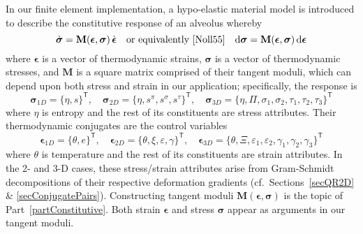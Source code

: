 In our finite element implementation, a hypo-elastic material model \cite{Truesdell55} is introduced to describe the constitutive response of an alveolus whereby
\begin{displaymath}
    \dot{\boldsymbol{\sigma}} = \mathbf{M} ( \boldsymbol{\epsilon} , \boldsymbol{\sigma} ) \, \dot{\boldsymbol{\epsilon}} 
    \quad \text{or equivalently \cite{Noll55}} \quad
    \mathrm{d} \boldsymbol{\sigma} = \mathbf{M} ( \boldsymbol{\epsilon} , \boldsymbol{\sigma} ) \, \mathrm{d} \boldsymbol{\epsilon}
\end{displaymath} 
where $\boldsymbol{\epsilon}$ is a vector of thermo\-dynamic strains, $\boldsymbol{\sigma}$ is a vector of thermo\-dynamic stresses, and $\mathbf{M}$ is a square matrix comprised of their tangent moduli, which can depend upon both stress and strain in our application; specifically, the response is
\begin{displaymath}
   \boldsymbol{\sigma}_{1D} = \{ \eta , s \}^{\mathsf{T}} , \quad
   \boldsymbol{\sigma}_{2D} = \{ \eta , s^{\pi} , s^{\sigma} , s^{\tau} \}^{\mathsf{T}} , \quad
   \boldsymbol{\sigma}_{3D} = \{ \eta , \Pi , \sigma_1 , \sigma_2 , \tau_1 , \tau_2 , \tau_3 \}^{\mathsf{T}}
\end{displaymath}
where $\eta$ is entropy and the rest of its constituents are stress attributes.  Their thermo\-dynamic conjugates are the control variables
\begin{displaymath}
\boldsymbol{\epsilon}_{1D} = \{ \theta , e \}^{\mathsf{T}} , \quad
\boldsymbol{\epsilon}_{2D} = \{ \theta , \xi , \varepsilon , \gamma \}^{\mathsf{T}} , \quad
\boldsymbol{\epsilon}_{3D} = \{ \theta , \Xi , \varepsilon_1 , \varepsilon_2 , \gamma_1 , \gamma_2 , \gamma_3 \}^{\mathsf{T}}
\end{displaymath}
where $\theta$ is temperature and the rest of its constituents are strain attributes.  In the 2- and 3-D cases, these stress\slash strain attributes arise from Gram-Schmidt decompositions of their respective deformation gradients (cf.\ Sections~\ref{secQR2D} \& \ref{secConjugatePairs}).  Constructing tangent moduli $\mathbf{M} ( \boldsymbol{\epsilon} , \boldsymbol{\sigma} )$ is the topic of Part~\ref{partConstitutive}.  Both strain $\boldsymbol{\epsilon}$ and stress $\boldsymbol{\sigma}$ appear as arguments in our tangent moduli.

